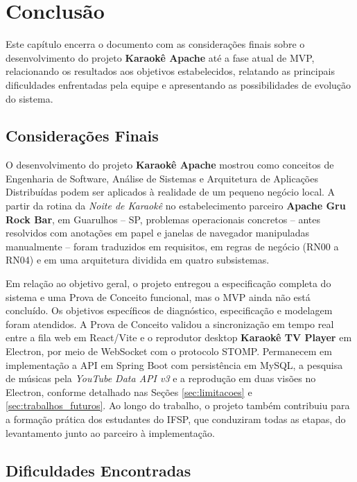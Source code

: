 \chapter{Conclusão} \label{cap:conclusao}

Este capítulo encerra o documento com as considerações finais sobre o desenvolvimento do projeto \textbf{Karaokê Apache} até a fase atual de MVP, relacionando os resultados aos objetivos estabelecidos, relatando as principais dificuldades enfrentadas pela equipe e apresentando as possibilidades de evolução do sistema.

\section{Considerações Finais}

O desenvolvimento do projeto \textbf{Karaokê Apache} mostrou como conceitos de Engenharia de Software, Análise de Sistemas e Arquitetura de Aplicações Distribuídas podem ser aplicados à realidade de um pequeno negócio local. A partir da rotina da \textit{Noite de Karaokê} no estabelecimento parceiro \textbf{Apache Gru Rock Bar}, em Guarulhos -- SP, problemas operacionais concretos -- antes resolvidos com anotações em papel e janelas de navegador manipuladas manualmente -- foram traduzidos em requisitos, em regras de negócio (RN00 a RN04) e em uma arquitetura dividida em quatro subsistemas.

Em relação ao objetivo geral, o projeto entregou a especificação completa do sistema e uma Prova de Conceito funcional, mas o MVP ainda não está concluído. Os objetivos específicos de diagnóstico, especificação e modelagem foram atendidos. A Prova de Conceito validou a sincronização em tempo real entre a fila web em React/Vite e o reprodutor desktop \textbf{Karaokê TV Player} em Electron, por meio de WebSocket com o protocolo STOMP. Permanecem em implementação a API em Spring Boot com persistência em MySQL, a pesquisa de músicas pela \textit{YouTube Data API v3} e a reprodução em duas visões no Electron, conforme detalhado nas Seções \ref{sec:limitacoes} e \ref{sec:trabalhos_futuros}. Ao longo do trabalho, o projeto também contribuiu para a formação prática dos estudantes do IFSP, que conduziram todas as etapas, do levantamento junto ao parceiro à implementação.

\section{Dificuldades Encontradas}

